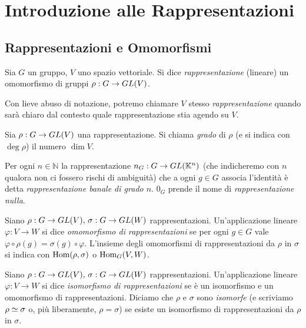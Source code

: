 \chapter{Introduzione alle Rappresentazioni}

\section{Rappresentazioni e Omomorfismi}

\begin{definition}
Sia $G$ un gruppo, $V$ uno spazio vettoriale. Si dice \emph{rappresentazione} (lineare) un omomorfismo di gruppi $\rho:G\to GL(V)$.
\end{definition}

Con lieve abuso di notazione, potremo chiamare $V$ stesso \emph{rappresentazione} quando sarà chiaro dal contesto quale rappresentazione stia agendo su $V$.

\begin{definition}
Sia $\rho:G\to GL(V)$ una rappresentazione. Si chiama \emph{grado} di $\rho$ (e si indica con $\deg\rho$) il numero $\dim V$.
\end{definition}

\begin{example}
Per ogni $n\in\mathbb{N}$ la rappresentazione $n_G:G\to GL(\mathbb{K}^n)$ (che indicheremo con $n$ qualora non ci fossero rischi di ambiguità) che a ogni $g\in G$ associa l'identità è detta \emph{rappresentazione banale di grado $n$}. $0_G$ prende il nome di \emph{rappresentazione nulla}.
\end{example}

\begin{definition}
Siano $\rho:G\to GL(V),\,\allowbreak\sigma:G\to GL(W)$ rappresentazioni. Un'applicazione lineare $\varphi:V\to W$ si dice \emph{omomorfismo di rappresentazioni} se per ogni $g\in G$ vale $\varphi\circ\rho(g)=\sigma(g)\circ\varphi$. L'insieme degli omomorfismi di rappresentazioni da $\rho$ in $\sigma$ si indica con $\operatorname{Hom}(\rho,\sigma)$ o $\operatorname{Hom}_G(V, W)$.
\end{definition}

\begin{definition}
Siano $\rho:G\to GL(V),\,\allowbreak\sigma:G\to GL(W)$ rappresentazioni. Un'applicazione lineare $\varphi:V\to W$ si dice \emph{isomorfismo di rappresentazioni} se è un isomorfismo e un omomorfismo di rappresentazioni. Diciamo che $\rho$ e $\sigma$ sono \emph{isomorfe} (e scriviamo $\rho\simeq\sigma$ o, più liberamente, $\rho=\sigma$) se esiste un isomorfismo di rappresentazioni da $\rho$ in $\sigma$.
\end{definition}

